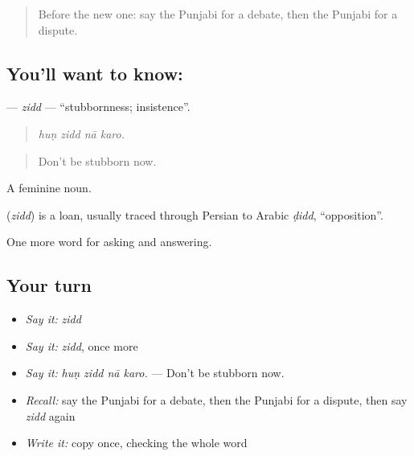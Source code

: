 \label{lesson:PA-C344-zidd}



\begin{quote}
Before the new one: say the Punjabi for a debate, then the Punjabi for a dispute.
\end{quote}

\subsection*{You'll want to know: }
\textbf{} — \emph{zidd} — \textquotedblleft{}stubbornness; insistence\textquotedblright{}.

\begin{quote}
   
\end{quote}

\begin{quote}
\emph{huṇ zidd nā karo.}
\end{quote}

\begin{quote}
Don't be stubborn now.
\end{quote}

A feminine noun.

\begin{cousinweb}
\textbf{} (\emph{zidd}) is a loan, usually traced through Persian to Arabic \emph{ḍidd}, \textquotedblleft{}opposition\textquotedblright{}.
\end{cousinweb}

\begin{grammarlens}[title={What you've built}]
One more word for asking and answering.
\end{grammarlens}

\subsection*{Your turn}
\begin{itemize}
\raggedright
  \item \emph{Say it:} \emph{zidd}
  \item \emph{Say it:} \emph{zidd}, once more
  \item \emph{Say it:} \emph{huṇ zidd nā karo.} — Don't be stubborn now.
  \item \emph{Recall:} say the Punjabi for a debate, then the Punjabi for a dispute, then say \emph{zidd} again
  \item \emph{Write it:} copy \textbf{} once, checking the whole word
\end{itemize}

